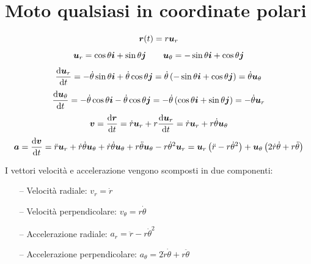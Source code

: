 \section{Moto qualsiasi in coordinate polari}
\begin{equation*}\boldsymbol{r}(t)=r\boldsymbol{u}_r\end{equation*}
\begin{equation*}\boldsymbol{u}_r=\cos\theta\boldsymbol{i}+\sin\theta\boldsymbol{j}\qquad \boldsymbol{u}_\theta=-\sin\theta\boldsymbol{i}+\cos\theta\boldsymbol{j}\end{equation*}
\[\frac{\mathrm{d}\boldsymbol{u}_r}{\mathrm{d} t}=-\dot\theta\sin\theta\boldsymbol{i}+\dot\theta\cos\theta\boldsymbol{j}=\dot\theta\left(-\sin\theta\boldsymbol{i}+\cos\theta\boldsymbol{j}\right)=\dot\theta\boldsymbol{u}_\theta\]
\[\frac{\mathrm{d}\boldsymbol{u}_\theta}{\mathrm{d} t}=-\dot\theta\cos\theta\boldsymbol{i}-\dot\theta\cos\theta\boldsymbol{j}=-\dot\theta\left(\cos\theta\boldsymbol{i}+\sin\theta\boldsymbol{j}\right)=-\dot\theta\boldsymbol{u}_r\]
\[\boldsymbol{v}=\frac{\mathrm{d}\boldsymbol{r}}{\mathrm{d} t}=\dot r\boldsymbol{u}_r+r\frac{\mathrm{d}\boldsymbol{u}_r}{\mathrm{d} t}=\dot r\boldsymbol{u}_r+r\dot\theta\boldsymbol{u}_\theta\]
\[\boldsymbol{a}=\frac{\mathrm{d}\boldsymbol{v}}{\mathrm{d} t}=\ddot r\boldsymbol{u}_r+\dot
r\dot\theta\boldsymbol{u}_\theta+\dot r\dot\theta\boldsymbol{u}_\theta+r\ddot\theta\boldsymbol{u}_\theta-r\dot\theta^2\boldsymbol{u}_r=\boldsymbol{u}_r\left(\ddot r-r\dot\theta^2\right)+\boldsymbol{u}_\theta\left(2\dot
r\dot\theta+r\ddot\theta\right)\]

 I vettori velocità e accelerazione vengono scomposti in due
componenti:
\begin{enumerate}
\item[--] Velocità radiale: $v_r=\dot r$
\item[--] Velocità perpendicolare: $v_\theta=r\dot\theta$
\item[--] Accelerazione radiale: $a_r=\ddot r-r\dot\theta^2$
\item[--] Accelerazione perpendicolare: $a_\theta=2\dot r\dot\theta+r\ddot
\theta$
\end{enumerate}
